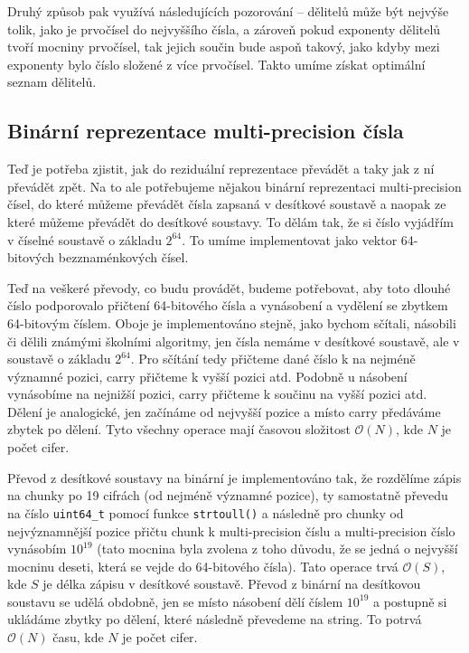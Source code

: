 \documentclass[titlepage]{article}
\begin{document}
Druhý způsob pak využívá následujících pozorování -- dělitelů může být nejvýše
tolik, jako je prvočísel do nejvyššího čísla, a zároveň pokud exponenty
dělitelů tvoří mocniny prvočísel, tak jejich součin bude aspoň takový, jako
kdyby mezi exponenty bylo číslo složené z více prvočísel. Takto umíme získat
optimální seznam dělitelů.

\subsection{Binární reprezentace multi-precision čísla}

Teď je potřeba zjistit, jak do reziduální reprezentace převádět a taky jak z ní
převádět zpět. Na to ale potřebujeme nějakou binární reprezentaci multi-precision
čísel, do které můžeme převádět čísla zapsaná v desítkové soustavě a naopak ze
které můžeme převádět do desítkové soustavy. To dělám tak, že si číslo vyjádřím
v číselné soustavě o základu $2^{64}$. To umíme implementovat jako vektor
64-bitových bezznaménkových čísel.

Teď na veškeré převody, co budu provádět, budeme potřebovat, aby toto dlouhé
číslo podporovalo přičtení 64-bitového čísla a vynásobení a vydělení se zbytkem
64-bitovým číslem. Oboje je implementováno stejně, jako bychom sčítali,
násobili či dělili známými školními algoritmy, jen čísla nemáme v desítkové
soustavě, ale v soustavě o základu $2^{64}$. Pro sčítání tedy přičteme dané
číslo k  na nejméně významné pozici, carry přičteme k vyšší pozici
atd. Podobně u násobení vynásobíme  na nejnižší pozici, carry
přičteme k součinu na vyšší pozici atd. Dělení je analogické, jen začínáme od
nejvyšší pozice a místo carry předáváme zbytek po dělení. Tyto všechny operace
mají časovou složitost $\mathcal{O}(N)$, kde $N$ je počet cifer.

Převod z desítkové soustavy na binární je implementováno tak, že rozdělíme
zápis na chunky po 19 cifrách (od nejméně významné pozice), ty samostatně
převedu na číslo \verb|uint64_t| pomocí funkce \verb|strtoull()| a následně pro
chunky od nejvýznamnější pozice přičtu chunk k multi-precision číslu a
multi-precision číslo vynásobím $10^{19}$ (tato mocnina byla zvolena z toho
důvodu, že se jedná o nejvyšší mocninu deseti, která se vejde do 64-bitového
čísla). Tato operace trvá $\mathcal{O}(S)$, kde $S$ je délka zápisu v desítkové
soustavě. Převod z binární na desítkovou soustavu se udělá obdobně, jen se
místo násobení dělí číslem $10^{19}$ a postupně si ukládáme zbytky po dělení,
které následně převedeme na string. To potrvá $\mathcal{O}(N)$ času, kde $N$ je
počet cifer.
\end{document}
